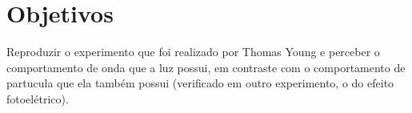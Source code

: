 \section{Objetivos}\label{objetivos}

Reproduzir o experimento que foi realizado por Thomas Young e perceber o comportamento de onda que a luz possui, em contraste com o comportamento de partucula que ela também possui (verificado em outro experimento, o do efeito fotoelétrico).